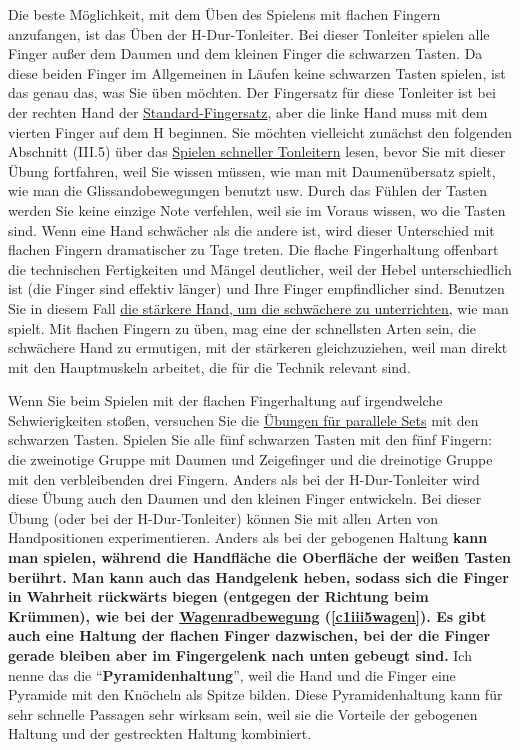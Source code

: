 Die beste Möglichkeit, mit dem Üben des Spielens mit flachen Fingern anzufangen, ist das Üben der H-Dur-Tonleiter.
Bei dieser Tonleiter spielen alle Finger außer dem Daumen und dem kleinen Finger die schwarzen Tasten.
Da diese beiden Finger im Allgemeinen in Läufen keine schwarzen Tasten spielen, ist das genau das, was Sie üben möchten.
Der Fingersatz für diese Tonleiter ist bei der rechten Hand der \hyperref[table]{Standard-Fingersatz}, aber die linke Hand muss mit dem vierten Finger auf dem H beginnen.
Sie möchten vielleicht zunächst den folgenden Abschnitt (III.5) über das \hyperref[c1iii5]{Spielen schneller Tonleitern} lesen, bevor Sie mit dieser Übung fortfahren, weil Sie wissen müssen, wie man mit Daumenübersatz spielt, wie man die Glissandobewegungen benutzt usw.
Durch das Fühlen der Tasten werden Sie keine einzige Note verfehlen, weil sie im Voraus wissen, wo die Tasten sind.
Wenn eine Hand schwächer als die andere ist, wird dieser Unterschied mit flachen Fingern dramatischer zu Tage treten. Die flache Fingerhaltung offenbart die technischen Fertigkeiten und Mängel deutlicher, weil der Hebel unterschiedlich ist (die Finger sind effektiv länger) und Ihre Finger empfindlicher sind.
Benutzen Sie in diesem Fall \hyperref[c1ii20]{die stärkere Hand, um die schwächere zu unterrichten}, wie man spielt.
Mit flachen Fingern zu üben, mag eine der schnellsten Arten sein, die schwächere Hand zu ermutigen, mit der stärkeren gleichzuziehen, weil man direkt mit den Hauptmuskeln arbeitet, die für die Technik relevant sind.

Wenn Sie beim Spielen mit der flachen Fingerhaltung auf irgendwelche Schwierigkeiten stoßen, versuchen Sie die \hyperref[c1iii7b]{Übungen für parallele Sets} mit den schwarzen Tasten.
Spielen Sie alle fünf schwarzen Tasten mit den fünf Fingern: die zweinotige Gruppe mit Daumen und Zeigefinger und die dreinotige Gruppe mit den verbleibenden drei Fingern.
Anders als bei der H-Dur-Tonleiter wird diese Übung auch den Daumen und den kleinen Finger entwickeln.
Bei dieser Übung (oder bei der H-Dur-Tonleiter) können Sie mit allen Arten von Handpositionen experimentieren.
Anders als bei der gebogenen Haltung \textbf{kann man spielen, während die Handfläche die Oberfläche der weißen Tasten berührt.
Man kann auch das Handgelenk heben, sodass sich die Finger in Wahrheit rückwärts biegen (entgegen der Richtung beim Krümmen), wie bei der \hyperref[c1iii5wagen]{Wagenradbewegung} (\ref*{c1iii5wagen}).
Es gibt auch eine Haltung der flachen Finger dazwischen, bei der die Finger gerade bleiben aber im Fingergelenk nach unten gebeugt sind.}
Ich nenne das die \enquote{\textbf{Pyramidenhaltung}}, weil die Hand und die Finger eine Pyramide mit den Knöcheln als Spitze bilden.
Diese Pyramidenhaltung kann für sehr schnelle Passagen sehr wirksam sein, weil sie die Vorteile der gebogenen Haltung und der gestreckten Haltung kombiniert.

